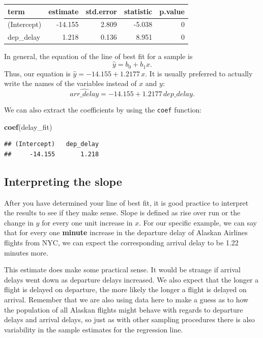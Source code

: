 \documentclass[]{tufte-book}
\newenvironment{Shaded}{\begin{snugshade}}{\end{snugshade}}
\newcommand{\KeywordTok}[1]{\textcolor[rgb]{0.13,0.29,0.53}{\textbf{{#1}}}}
\newcommand{\NormalTok}[1]{{#1}}
\begin{document}
\begin{tabular}{l|r|r|r|r}
\hline
term & estimate & std.error & statistic & p.value\\
\hline
(Intercept) & -14.155 & 2.809 & -5.038 & 0\\
\hline
dep\_delay & 1.218 & 0.136 & 8.951 & 0\\
\hline
\end{tabular}

In general, the equation of the line of best fit for a sample is
\[\hat{y} = b_0 + b_1 x.\] Thus, our equation is
\(\hat{y} = -14.155 + 1.2177 \, x.\) It is usually preferred to actually
write the names of the variables instead of \(x\) and \(y\):
\[\widehat{arr\_delay} = -14.155 + 1.2177 \, dep\_delay.\]

We can also extract the coefficients by using the \texttt{coef}
function:

\begin{Shaded}
\begin{Highlighting}[]
\KeywordTok{coef}\NormalTok{(delay_fit)}
\end{Highlighting}
\end{Shaded}

\begin{verbatim}
## (Intercept)   dep_delay 
##     -14.155       1.218
\end{verbatim}

\subsection{Interpreting the slope}\label{interpreting-the-slope}

After you have determined your line of best fit, it is good practice to
interpret the results to see if they make sense. Slope is defined as
rise over run or the change in \(y\) for every one unit increase in
\(x\). For our specific example, we can say that for every one
\textbf{minute} increase in the departure delay of Alaskan Airlines
flights from NYC, we can expect the corresponding arrival delay to be
1.22 minutes more.

This estimate does make some practical sense. It would be strange if
arrival delays went down as departure delays increased. We also expect
that the longer a flight is delayed on departure, the more likely the
longer a flight is delayed on arrival. Remember that we are also using
data here to make a guess as to how the population of all Alaskan
flights might behave with regards to departure delays and arrival
delays, so just as with other sampling procedures there is also
variability in the sample estimates for the regression line.
\end{document}
